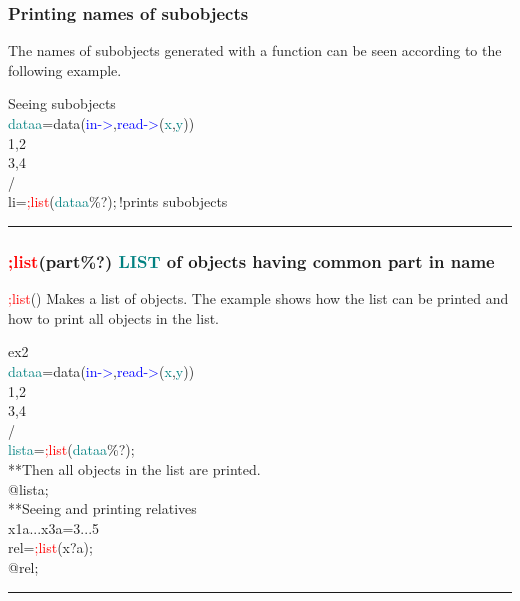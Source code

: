 \subsubsection{Printing names of subobjects} 
\label{inpusub1} 
The names of subobjects generated with a function can be seen according 
to the following example. 
\singlespacing 
\begin{example}[subobjex]Seeing subobjects\\ 
\label{subobjex} 
\noindent \textcolor{teal}{dataa}=\textcolor{VioletRed}{data}(\textcolor{blue}{in->},\textcolor{blue}{read->}(\textcolor{teal}{x},\textcolor{teal}{y}))\\ 
1,2\\ 
3,4\\ 
/  \\ 
li=\textcolor{Red}{;list}(\textcolor{teal}{dataa}\%?);\,{\color{ForestGreen}!prints subobjects}\\ 
\end{example} 
\vspace{-7mm} \rule{5cm}{0.1pt} 
\onehalfspacing 
\subsubsection{\textcolor{Red}{;list}(part\%?) \textcolor{teal}{LIST} of objects having common part in name} 
\label{inpusub2} 
\textcolor{Red}{;list}() Makes a list of objects. The example shows how the list can be printed and how 
to print all objects in the list. 
 
\singlespacing 
\begin{example}[subobjex2]ex2\\ 
\label{subobjex2} 
\noindent \textcolor{teal}{dataa}=\textcolor{VioletRed}{data}(\textcolor{blue}{in->},\textcolor{blue}{read->}(\textcolor{teal}{x},\textcolor{teal}{y}))\\ 
1,2\\ 
3,4\\ 
/  \\ 
\textcolor{teal}{lista}=\textcolor{Red}{;list}(\textcolor{teal}{dataa}\%?);\\ 
{\color{ForestGreen}**Then all objects in the list are printed.}\\ 
@lista;\\ 
{\color{ForestGreen}**Seeing and printing relatives}\\ 
x1a...x3a=3...5\\ 
 
rel=\textcolor{Red}{;list}(x?a);\\ 
@rel;\\ 
\end{example} 
\vspace{-7mm} \rule{5cm}{0.1pt} 
\onehalfspacing 
